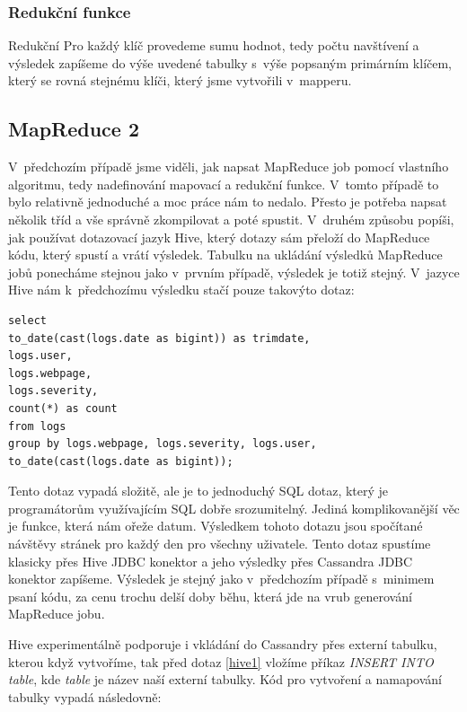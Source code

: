 \subsubsection{Redukční funkce}
Redukční  Pro každý klíč provedeme sumu hodnot, tedy počtu navštívení a výsledek zapíšeme do výše uvedené tabulky s~výše popsaným primárním klíčem, který se rovná stejnému klíči, který jsme vytvořili v~mapperu. 

\subsection{MapReduce 2}
V~předchozím případě jsme viděli, jak napsat MapReduce job pomocí vlastního algoritmu, tedy nadefinování mapovací a redukční funkce. V~tomto případě to bylo relativně jednoduché a moc práce nám to nedalo. Přesto je potřeba napsat několik tříd a vše správně zkompilovat a poté spustit. V~druhém způsobu popíši, jak používat dotazovací jazyk Hive, který dotazy sám přeloží do MapReduce kódu, který spustí a vrátí výsledek. Tabulku na ukládání výsledků MapReduce jobů ponecháme stejnou jako v~prvním případě, výsledek je totiž stejný. V~jazyce Hive nám k~předchozímu výsledku stačí pouze takovýto dotaz:

\begin{lstlisting}[caption={Tabulka pro ukládání reportů},label=Hive1]
select 
to_date(cast(logs.date as bigint)) as trimdate,
logs.user,
logs.webpage,
logs.severity, 
count(*) as count
from logs 
group by logs.webpage, logs.severity, logs.user,
to_date(cast(logs.date as bigint));
\end{lstlisting}

Tento dotaz vypadá složitě, ale je to jednoduchý SQL dotaz, který je programátorům využívajícím SQL dobře srozumitelný. Jediná komplikovanější věc je funkce, která nám ořeže datum. Výsledkem tohoto dotazu jsou spočítané návštěvy stránek pro každý den pro všechny uživatele. Tento dotaz spustíme klasicky přes Hive JDBC konektor a jeho výsledky přes Cassandra JDBC konektor zapíšeme. Výsledek je stejný jako v~předchozím případě s~minimem psaní kódu, za cenu trochu delší doby běhu, která jde na vrub generování MapReduce jobu. 

Hive experimentálně podporuje i vkládání do Cassandry přes externí tabulku, kterou když vytvoříme, tak před dotaz \ref{hive1} vložíme příkaz \emph{INSERT INTO table}, kde \emph{table} je název naší externí tabulky. Kód pro vytvoření a namapování tabulky vypadá následovně: 


